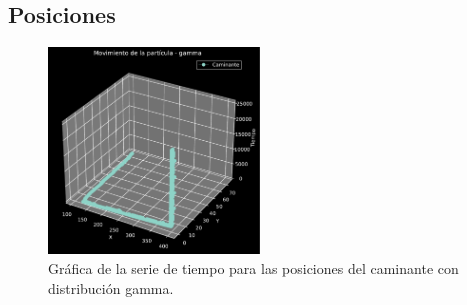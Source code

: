 \documentclass[11pt]{article} %
\begin{document}
	
	\subsection{Posiciones}
	\begin{figure}[h]
		\centering
		\includegraphics[width=0.5\textwidth]{graf_posiciones_gamma.pdf}
		\caption{Gráfica de la serie de tiempo para las posiciones del caminante con distribución gamma.}
		\label{fig:posGammaGraf}
	\end{figure}
\end{document}
